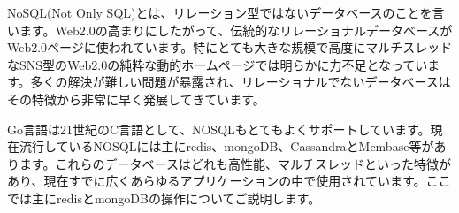 NoSQL(Not Only SQL)とは、リレーション型ではないデータベースのことを言います。Web2.0の高まりにしたがって、伝統的なリレーショナルデータベースがWeb2.0ページに使われています。特にとても大きな規模で高度にマルチスレッドなSNS型のWeb2.0の純粋な動的ホームページでは明らかに力不足となっています。多くの解決が難しい問題が暴露され、リレーショナルでないデータベースはその特徴から非常に早く発展してきています。

Go言語は21世紀のC言語として、NOSQLもとてもよくサポートしています。現在流行しているNOSQLには主にredis、mongoDB、CassandraとMembase等があります。これらのデータベースはどれも高性能、マルチスレッドといった特徴があり、現在すでに広くあらゆるアプリケーションの中で使用されています。ここでは主にredisとmongoDBの操作についてご説明します。


